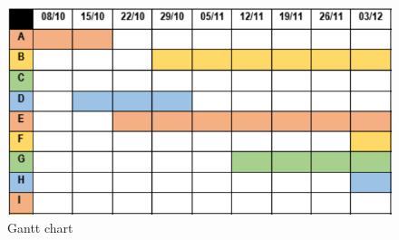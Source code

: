 \documentclass{sig-alternate-05-2015}
\begin{document}
\begin{figure}[t]
\centering
\includegraphics[scale=0.33]{Images/gantt.png}
\caption{Gantt chart}
\label{fig:Gantt}
\end{figure}
\end{document}
